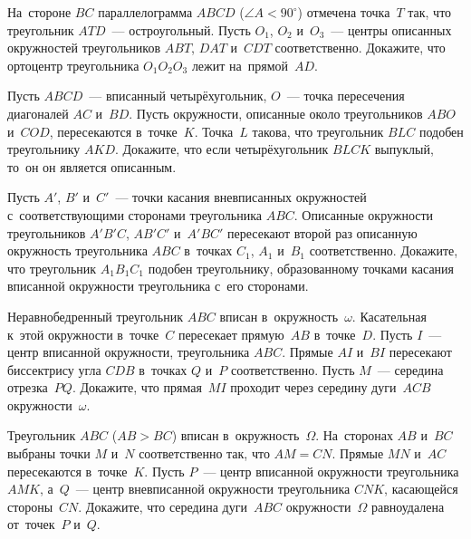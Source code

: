


\begin{problems}

\item
На~стороне $BC$ параллелограмма $ABCD$ ($\angle A < 90^{\circ}$) отмечена
точка~$T$ так, что треугольник $ATD$~--- остроугольный.
Пусть $O_{1}$, $O_{2}$ и~$O_{3}$~--- центры описанных окружностей
треугольников $ABT$, $DAT$ и~$CDT$ соответственно.
Докажите, что ортоцентр треугольника $O_{1}O_{2}O_{3}$ лежит на~прямой~$AD$.

\item
Пусть $ABCD$~--- вписанный четырёхугольник, $O$~--- точка пересечения
диагоналей $AC$ и~$BD$.
Пусть окружности, описанные около треугольников $ABO$ и~$COD$, пересекаются
в~точке~$K$.
Точка~$L$ такова, что треугольник $BLC$ подобен треугольнику $AKD$.
Докажите, что если четырёхугольник $BLCK$ выпуклый, то~он он является
описанным.

\item
Пусть $A'$, $B'$ и~$C'$~--- точки касания вневписанных окружностей
с~соответствующими сторонами треугольника $ABC$.
Описанные окружности треугольников $A'B'C$, $AB'C'$ и~$A'BC'$ пересекают второй
раз описанную окружность треугольника $ABC$ в~точках $C_{1}$, $A_{1}$ и~$B_{1}$
соответственно.
Докажите, что треугольник $A_{1}B_{1}C_{1}$ подобен треугольнику, образованному
точками касания вписанной окружности треугольника с~его сторонами.

\item
Неравнобедренный треугольник $ABC$ вписан в~окружность~$\omega$.
Касательная к~этой окружности в~точке~$C$ пересекает прямую~$AB$ в~точке~$D$.
Пусть $I$~--- центр вписанной окружности, треугольника $ABC$.
Прямые $AI$ и~$BI$ пересекают биссектрису угла $CDB$ в~точках $Q$ и~$P$
соответственно.
Пусть $M$~--- середина отрезка~$PQ$.
Докажите, что прямая~$MI$ проходит через середину дуги~$ACB$
окружности~$\omega$.

\item
Треугольник $ABC$ ($AB > BC$) вписан в~окружность~$\Omega$.
На~сторонах $AB$ и~$BC$ выбраны точки $M$ и~$N$ соответственно так, что
$AM = CN$.
Прямые $MN$ и~$AC$ пересекаются в~точке~$K$.
Пусть $P$~--- центр вписанной окружности треугольника $AMK$, а~$Q$~--- центр
вневписанной окружности треугольника $CNK$, касающейся стороны~$CN$.
Докажите, что середина дуги~$ABC$ окружности~$\Omega$ равноудалена
от~точек~$P$ и~$Q$.

\end{problems}

